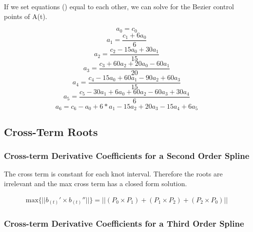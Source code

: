 \documentclass{article}
\begin{document}
 If we set equations () equal to each other, we can solve for the Bezier control points of A(t).
 
 \begin{equation}
     a_0 = c_0
 \end{equation}
  \begin{equation}
     a_1 = \frac{c_1 + 6 a_0}{6}
 \end{equation}
  \begin{equation}
     a_2 = \frac{c_2 - 15 a_0 + 30 a_1}{15}
 \end{equation}
  \begin{equation}
     a_3 = \frac{c_3 + 60 a_2 + 20 a_0 - 60 a_1}{20}
 \end{equation}
  \begin{equation}
     a_4 = \frac{c_4 -15 a_0 + 60 a_1 - 90 a_2 + 60 a_3}{15}
 \end{equation}
   \begin{equation}
     a_5 = \frac{c_5 - 30 a_1 + 6 a_0 + 60 a_2 - 60 a_3 + 30 a_4}{6}
 \end{equation}
    \begin{equation}
     a_6 = c_6 - a_0 + 6*a_1 - 15 a_2 + 20 a_3 - 15 a_4 + 6 a_5
 \end{equation}

\subsection{Cross-Term Roots}

\subsubsection{Cross-term Derivative Coefficients for a Second Order Spline} \label{sec:Cross-term Derivative Coefficients for a Second Order Spline}

    The cross term is constant for each knot interval. Therefore the roots are irrelevant and the max cross term has a closed form solution.

\begin{equation}
\begin{aligned}
    \text{max}\{||b_{(t)}' \times b_{(t)}''||\} =  \Big|\Big|  (P_0 \times P_1) + (P_1 \times P_2) + (P_2 \times P_0) \Big|\Big|
\end{aligned}
\end{equation}

\subsubsection{Cross-term Derivative Coefficients for a Third Order Spline} \label{section:Cross-term Derivative Coefficients for a Third Order Spline}
\end{document}
